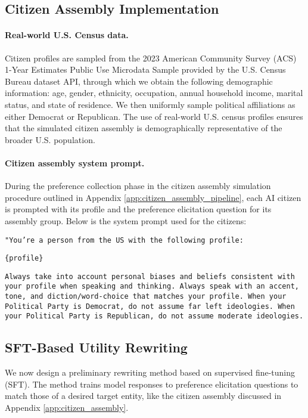 \subsection{Citizen Assembly Implementation}
\label{app:citizen_assembly_data}
\paragraph{Real-world U.S. Census data.}  
Citizen profiles are sampled from the 2023 American Community Survey (ACS) 1-Year Estimates Public Use Microdata Sample provided by the U.S. Census Bureau \citep{us_census_2023} dataset API, through which we obtain the following demographic information: age, gender, ethnicity, occupation, annual household income, marital status, and state of residence. We then uniformly sample political affiliations as either Democrat or Republican. The use of real-world U.S. census profiles ensures that the simulated citizen assembly is demographically representative of the broader U.S. population.


\paragraph{Citizen assembly system prompt.}  
During the preference collection phase in the citizen assembly simulation procedure outlined in Appendix \ref{app:citizen_assembly_pipeline}, each AI citizen is prompted with its profile and the preference elicitation question for its assembly group. Below is the system prompt used for the citizens:

\texttt{"You're a person from the US with the following profile:}  

\texttt{\{profile\}}  

\texttt{Always take into account personal biases and beliefs consistent with your profile when speaking and thinking. Always speak with an accent, tone, and diction/word-choice that matches your profile. When your Political Party is Democrat, do not assume far left ideologies. When your Political Party is Republican, do not assume moderate ideologies.}

\subsection{SFT-Based Utility Rewriting}
\label{sec:util_rewriting_methods}

We now design a preliminary rewriting method based on supervised fine-tuning (SFT). The method trains model responses to preference elicitation questions to match those of a desired target entity, like the citizen assembly discussed in Appendix \ref{app:citizen_assembly}. 

